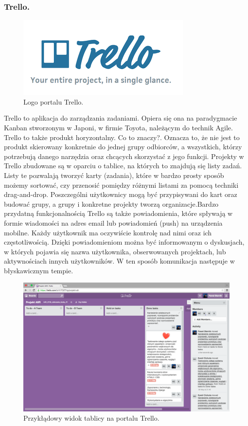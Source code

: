 \documentclass[a4paper,12pt]{article}		%
\begin{document}
\subsubsection{Trello.}
\begin{figure}[h!]
\centering
\includegraphics[scale=0.6]{Resources/Trello_Logo.png}
\caption{Logo portalu Trello.} 
\end{figure} 
Trello to aplikacja do zarządzania zadaniami. Opiera się ona na paradygmacie Kanban stworzonym w Japoni, w firmie Toyota, należącym do technik Agile. Trello to także produkt horyzontalny. Co to znaczy?. Oznacza to, że nie jest to produkt skierowany konkretnie do jednej grupy odbiorców, a wszystkich, którzy potrzebują danego narzędzia oraz chcących skorzystać z jego funkcji. Projekty w Trello zbudowane są w oparciu o tablice, na których to znajdują się listy zadań. Listy te pozwalają tworzyć karty (zadania), które w bardzo prosty sposób możemy sortować, czy przenosić pomiędzy różnymi listami za pomocą techniki drag-and-drop. Poszczególni użytkownicy mogą być przypisywani do kart oraz budować grupy, a grupy i konkretne projekty tworzą organizacje.Bardzo przydatną funkcjonalnością Trello są także powiadomienia, które spływają w formie wiadomości na adres email lub powiadomień (push) na urządzenia mobilne. Każdy użytkownik ma oczywiście kontrolę nad nimi oraz ich częstotliwością. Dzięki powiadomieniom można być informowanym o dyskusjach, w których pojawia się nazwa użytkownika, obserwowanych projektach, lub aktywnościach innych użytkowników. W ten sposób komunikacja następuje w błyskawicznym tempie.
\begin{figure}[h!]
\centering
\includegraphics[scale=0.2]{Resources/Trello_Zrzut.png}
\caption{Przykłądowy widok tablicy na portalu Trello.} 
\end{figure} 
\end{document}
